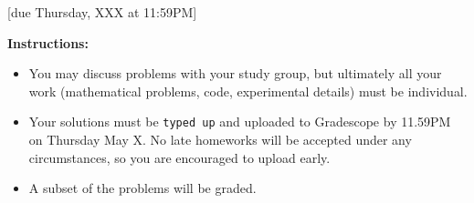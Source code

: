 \documentclass{article}
\begin{document}
[due Thursday, XXX at 11:59PM]

\textbf{Instructions:}
\begin{itemize}
    \item You may discuss problems with your study group, but ultimately all your work (mathematical problems, code, experimental details) must be individual.
    \item Your solutions must be \texttt{typed up} and uploaded to Gradescope by 11.59PM on Thursday May X. No late homeworks will be accepted under any circumstances, so you are encouraged to upload early.
    \item A subset of the problems will be graded.
\end{itemize}

\begin{probset}
\begin{prob}
    
\end{prob}
\end{probset}
\end{document}
